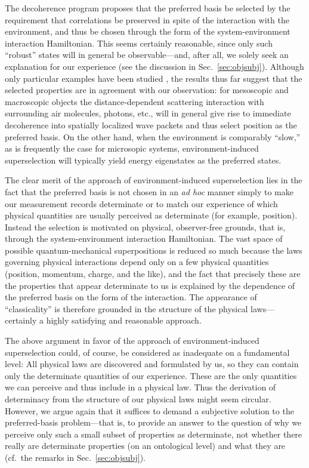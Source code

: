 \documentclass[twocolumn,rmp,aps,amsmath,amsfonts,noshowkeys,noshowpacs]{revtex4}
\newcommand{\cf}{cf.\ }
\begin{document}
The decoherence program proposes that the preferred basis be selected
by the requirement that correlations be preserved in spite of the
interaction with the environment, and thus be chosen through the form
of the system-environment interaction Hamiltonian. This seems
certainly reasonable, since only such ``robust'' states will in
general be observable---and, after all, we solely seek an explanation
for our experience (see the discussion in Sec.~\ref{sec:objsubj}).
Although only particular examples have been studied \citep[for a
survey and references, see, for
example,][]{Joos:2003:jh,Blanchard:2000:fq,Zurek:2002:ii}, the results
thus far suggest that the selected properties are in agreement with
our observation: for mesoscopic and macroscopic objects the
distance-dependent scattering interaction with surrounding air
molecules, photons, etc., will in general give rise to immediate
decoherence into spatially localized wave packets and thus select
position as the preferred basis. On the other hand, when the
environment is comparably ``slow,'' as is frequently the case for
microsopic systems, environment-induced superselection will typically
yield energy eigenstates as the preferred states.

The clear merit of the approach of environment-induced superselection
lies in the fact that the preferred basis is not chosen in an \emph{ad
  hoc} manner simply to make our measurement records determinate or to
match our experience of which physical quantities are usually
perceived as determinate (for example, position). Instead the
selection is motivated on physical, observer-free grounds, that is,
through the system-environment interaction Hamiltonian. The vast
space of possible quantum-mechanical superpositions is reduced so much
because the laws governing physical interactions depend only on a few
physical quantities (position, momentum, charge, and the like), and
the fact that precisely these are the properties that appear
determinate to us is explained by the dependence of the preferred
basis on the form of the interaction. The appearance of
``classicality'' is therefore grounded in the structure of the
physical laws---certainly a highly satisfying and reasonable approach.

The above argument in favor of the approach of environment-induced
superselection could, of course, be considered as inadequate on a
fundamental level: All physical laws are discovered and formulated by
us, so they can contain only the determinate quantities of our
experience. These are the only quantities we can perceive and thus
include in a physical law. Thus the derivation of determinacy from the
structure of our physical laws might seem circular.  However, we argue
again that it suffices to demand a subjective solution to the
preferred-basis problem---that is, to provide an answer to the
question of why we perceive only such a small subset of properties
as determinate, not whether there really are determinate
properties (on an ontological level) and what they are (\cf the
remarks in Sec.~\ref{sec:objsubj}).
\end{document}
